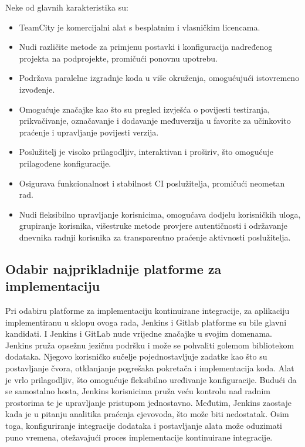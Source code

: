 \documentclass[a4paper,12pt,oneside]{article}
\begin{document}
\begin{enumerate}
Neke od glavnih karakteristika su:
\begin{itemize}
\item TeamCity je komercijalni alat s besplatnim i vlasničkim licencama.
\item Nudi različite metode za primjenu postavki i konfiguracija nadređenog projekta na podprojekte, promičući ponovnu upotrebu.
\item Podržava paralelne izgradnje koda u više okruženja, omogućujući istovremeno izvođenje.
\item Omogućuje značajke kao što su pregled izvješća o povijesti testiranja, prikvačivanje, označavanje i dodavanje međuverzija u favorite za učinkovito praćenje i upravljanje povijesti verzija.
\item Poslužitelj je visoko prilagodljiv, interaktivan i proširiv, što omogućuje prilagođene konfiguracije.
\item Osigurava funkcionalnost i stabilnost CI poslužitelja, promičući neometan rad.
\item Nudi fleksibilno upravljanje korisnicima, omogućava dodjelu korisničkih uloga, grupiranje korisnika, višestruke metode provjere autentičnosti i održavanje dnevnika radnji korisnika za transparentno praćenje aktivnosti poslužitelja.
\end{itemize}

\end{enumerate}

\subsection{Odabir najprikladnije platforme za implementaciju}

Pri odabiru platforme za implementaciju kontinuirane integracije, za aplikaciju implementiranu u sklopu ovoga rada, Jenkins i Gitlab platforme su bile glavni kandidati. I Jenkins i GitLab nude vrijedne značajke u svojim domenama. Jenkins pruža opsežnu jezičnu podršku i može se pohvaliti golemom bibliotekom dodataka. Njegovo korisničko sučelje pojednostavljuje zadatke kao što su postavljanje čvora, otklanjanje pogrešaka pokretača i implementacija koda. Alat je vrlo prilagodljiv, što omogućuje fleksibilno uređivanje konfiguracije. Budući da se samostalno hosta, Jenkins korisnicima pruža veću kontrolu nad radnim prostorima te je upravljanje pristupom jednostavno.
Međutim, Jenkins zaostaje kada je u pitanju analitika praćenja cjevovoda, što može biti nedostatak. Osim toga, konfiguriranje integracije dodataka i postavljanje alata može oduzimati puno vremena, otežavajući proces implementacije kontinuirane integracije.
\end{document}

